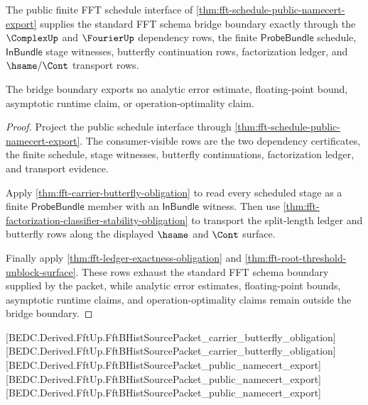 \begin{theorem}
\label{thm:fft-standard-schema-bridge-boundary}
The public finite FFT schedule interface of
\autoref{thm:fft-schedule-public-namecert-export} supplies the standard FFT
schema bridge boundary exactly through the $\ComplexUp$ and $\FourierUp$
dependency rows, the finite $\mathsf{ProbeBundle}$ schedule,
$\mathsf{InBundle}$ stage witnesses, butterfly continuation rows,
factorization ledger, and $\hsame/\Cont$ transport rows.

The bridge boundary exports no analytic error estimate, floating-point bound,
asymptotic runtime claim, or operation-optimality claim.
\end{theorem}
\begin{proof}
Project the public schedule interface through
\autoref{thm:fft-schedule-public-namecert-export}. The consumer-visible rows
are the two dependency certificates, the finite schedule, stage witnesses,
butterfly continuations, factorization ledger, and transport evidence.

Apply \autoref{thm:fft-carrier-butterfly-obligation} to read every scheduled
stage as a finite $\mathsf{ProbeBundle}$ member with an $\mathsf{InBundle}$
witness. Then use
\autoref{thm:fft-factorization-classifier-stability-obligation} to transport
the split-length ledger and butterfly rows along the displayed $\hsame$ and
$\Cont$ surface.

Finally apply \autoref{thm:fft-ledger-exactness-obligation} and
\autoref{thm:fft-root-threshold-unblock-surface}. These rows exhaust the
standard FFT schema boundary supplied by the packet, while analytic error
estimates, floating-point bounds, asymptotic runtime claims, and
operation-optimality claims remain outside the bridge boundary.
\end{proof}

[BEDC.Derived.FftUp.FftBHistSourcePacket\_carrier\_butterfly\_obligation]
[BEDC.Derived.FftUp.FftBHistSourcePacket\_carrier\_butterfly\_obligation]
[BEDC.Derived.FftUp.FftBHistSourcePacket\_public\_namecert\_export]
[BEDC.Derived.FftUp.FftBHistSourcePacket\_public\_namecert\_export]
[BEDC.Derived.FftUp.FftBHistSourcePacket\_public\_namecert\_export]


